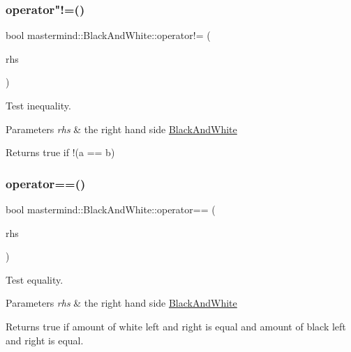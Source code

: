 \subsubsection{\texorpdfstring{operator"!=()}{operator!=()}}
{\footnotesize\ttfamily bool mastermind\+::\+Black\+And\+White\+::operator!= (\begin{DoxyParamCaption}\item[{const \hyperlink{classmastermind_1_1_black_and_white}{Black\+And\+White} \&}]{rhs }\end{DoxyParamCaption})}



Test inequality. 


\begin{DoxyParams}{Parameters}
{\em rhs} & the right hand side \hyperlink{classmastermind_1_1_black_and_white}{Black\+And\+White} \\
\hline
\end{DoxyParams}
\begin{DoxyReturn}{Returns}
true if {\ttfamily !(a == b)} 
\end{DoxyReturn}
\hypertarget{classmastermind_1_1_black_and_white_a218f949e75ce9e080c262f87a2263916}{}\label{classmastermind_1_1_black_and_white_a218f949e75ce9e080c262f87a2263916} 
\subsubsection{\texorpdfstring{operator==()}{operator==()}\hspace{0.1cm}{\footnotesize\ttfamily [1/2]}}
{\footnotesize\ttfamily bool mastermind\+::\+Black\+And\+White\+::operator== (\begin{DoxyParamCaption}\item[{const \hyperlink{classmastermind_1_1_black_and_white}{Black\+And\+White} \&}]{rhs }\end{DoxyParamCaption})}



Test equality. 


\begin{DoxyParams}{Parameters}
{\em rhs} & the right hand side \hyperlink{classmastermind_1_1_black_and_white}{Black\+And\+White} \\
\hline
\end{DoxyParams}
\begin{DoxyReturn}{Returns}
{\ttfamily true} if amount of white left and right is equal and amount of black left and right is equal. 
\end{DoxyReturn}
\hypertarget{classmastermind_1_1_black_and_white_a55c1255c7d53d52a053489c6d62a9762}{}\label{classmastermind_1_1_black_and_white_a55c1255c7d53d52a053489c6d62a9762} 
